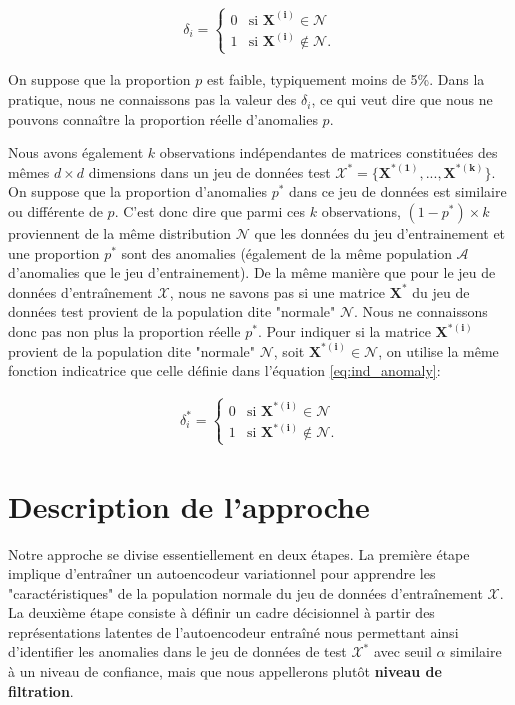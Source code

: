 \begin{gather*}  \label{eq:ind_anomaly}
\delta_{i}=
\begin{cases}
0 & \text{si $\boldsymbol{X^{(i)}}\in\mathcal{N}$} \\
1 & \text{si $\boldsymbol{X^{(i)}}\not\in\mathcal{N}$}.
\end{cases}
\end{gather*}

On suppose que la proportion $p$ est faible, typiquement moins de 5\%. Dans la pratique, nous ne connaissons pas la valeur des $\delta_i$, ce qui veut dire que nous ne pouvons connaître la proportion réelle d'anomalies $p$. 

Nous avons également $k$ observations indépendantes de matrices constituées des mêmes $d \times d$ dimensions dans un jeu de données test $\mathcal{X^*} = \{\boldsymbol{X^{*(1)}},...,\boldsymbol{X^{*(k)}}\}$. On suppose que la proportion d'anomalies $p^*$ dans ce jeu de données est similaire ou différente de $p$. C'est donc dire que parmi ces $k$ observations, $(1-p^*) \times k$ proviennent de la même distribution $\mathcal{N}$ que les données du jeu d'entrainement et une proportion $p^*$ sont des anomalies (également de la même population $\mathcal{A}$ d'anomalies que le jeu d'entrainement). De la même manière que pour le jeu de données d'entraînement $\mathcal{X}$, nous ne savons pas si une matrice $\boldsymbol{X^{*}}$ du jeu de données test provient de la population dite "normale" $\mathcal{N}$. Nous ne connaissons donc pas non plus la proportion réelle $p^*$. Pour indiquer si la matrice $\boldsymbol{X^{*(i)}}$ provient de la population dite "normale" $\mathcal{N}$, soit $ \boldsymbol{X^{*(i)}}\in\mathcal{N}$, on utilise la même fonction indicatrice que celle définie dans l'équation \ref{eq:ind_anomaly}:

\begin{gather}  \label{eq:ind_anomaly}
\delta^{*}_{i}=
\begin{cases}
0 & \text{si $\boldsymbol{X^{*(i)}}\in\mathcal{N}$} \\
1 & \text{si $\boldsymbol{X^{*(i)}}\not\in\mathcal{N}$}.
\end{cases}
\end{gather}


\section{Description de l'approche} \label{section:description}

Notre approche se divise essentiellement en deux étapes. La première étape implique d'entraîner un autoencodeur variationnel pour apprendre les "caractéristiques" de la population normale du jeu de données d'entraînement $\mathcal{X}$. La deuxième étape consiste à définir un cadre décisionnel à partir des représentations latentes de l'autoencodeur entraîné nous permettant ainsi d'identifier les anomalies dans le jeu de données de test $\mathcal{X^*}$ avec seuil $\alpha$ similaire à un niveau de confiance, mais que nous appellerons plutôt \textbf{niveau de filtration}.

